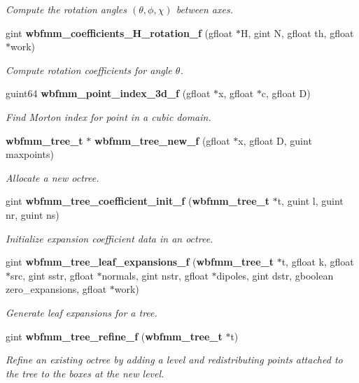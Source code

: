 \begin{DoxyCompactItemize}
\begin{DoxyCompactList}\small\item\em Compute the rotation angles $(\theta,\phi,\chi)$ between axes. \end{DoxyCompactList}\item 
gint {\bf wbfmm\+\_\+coefficients\+\_\+\+H\+\_\+rotation\+\_\+f} (gfloat $\ast$H, gint N, gfloat th, gfloat $\ast$work)
\begin{DoxyCompactList}\small\item\em Compute rotation coefficients for angle $\theta$. \end{DoxyCompactList}\item 
guint64 {\bf wbfmm\+\_\+point\+\_\+index\+\_\+3d\+\_\+f} (gfloat $\ast$x, gfloat $\ast$c, gfloat D)
\begin{DoxyCompactList}\small\item\em Find Morton index for point in a cubic domain. \end{DoxyCompactList}\item 
{\bf wbfmm\+\_\+tree\+\_\+t} $\ast$ {\bf wbfmm\+\_\+tree\+\_\+new\+\_\+f} (gfloat $\ast$x, gfloat D, guint maxpoints)
\begin{DoxyCompactList}\small\item\em Allocate a new octree. \end{DoxyCompactList}\item 
gint {\bf wbfmm\+\_\+tree\+\_\+coefficient\+\_\+init\+\_\+f} ({\bf wbfmm\+\_\+tree\+\_\+t} $\ast$t, guint l, guint nr, guint ns)
\begin{DoxyCompactList}\small\item\em Initialize expansion coefficient data in an octree. \end{DoxyCompactList}\item 
gint {\bf wbfmm\+\_\+tree\+\_\+leaf\+\_\+expansions\+\_\+f} ({\bf wbfmm\+\_\+tree\+\_\+t} $\ast$t, gfloat k, gfloat $\ast$src, gint sstr, gfloat $\ast$normals, gint nstr, gfloat $\ast$dipoles, gint dstr, gboolean zero\+\_\+expansions, gfloat $\ast$work)
\begin{DoxyCompactList}\small\item\em Generate leaf expansions for a tree. \end{DoxyCompactList}\item 
gint {\bf wbfmm\+\_\+tree\+\_\+refine\+\_\+f} ({\bf wbfmm\+\_\+tree\+\_\+t} $\ast$t)
\begin{DoxyCompactList}\small\item\em Refine an existing octree by adding a level and redistributing points attached to the tree to the boxes at the new level. \end{DoxyCompactList}\item 

\end{DoxyCompactItemize}

